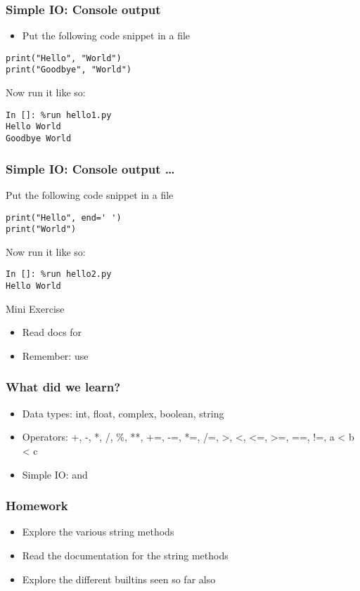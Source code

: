 \documentclass[14pt,compress]{beamer}
\begin{document}
\begin{frame}[fragile]
  \frametitle{Simple IO: Console output}
  \begin{itemize}
  \item Put the following code snippet in a file 
  \end{itemize}
  \begin{lstlisting}
print("Hello", "World")
print("Goodbye", "World")
\end{lstlisting}
Now run it like so:
\begin{lstlisting}
In []: %run hello1.py
Hello World
Goodbye World
  \end{lstlisting}
\end{frame}

\begin{frame}[fragile]
  \frametitle{Simple IO: Console output \ldots}
Put the following code snippet in a file 
  \begin{lstlisting}
print("Hello", end=' ')
print("World")
\end{lstlisting}
Now run it like so:
\begin{lstlisting}
In []: %run hello2.py
Hello World
  \end{lstlisting}

\pause

\begin{block}{Mini Exercise}
  \begin{itemize}
  \item Read docs for 
  \item Remember: use  \
  \end{itemize}
\end{block}
\end{frame}

\begin{frame}[fragile]
  \frametitle{What did we learn?}
  \begin{itemize}
    \item Data types: int, float, complex, boolean, string
    \item Operators: +, -, *, /, \%, **, +=, -=, *=, /=, >, <, <=, >=, ==, !=, a < b < c
    \item Simple IO: \kwrd{input} and \kwrd{print}
  \end{itemize}
\end{frame}

\begin{frame}
  \frametitle{Homework}
  \begin{itemize}
  \item Explore the various string methods
  \item Read the documentation for the string methods
  \item Explore the different builtins seen so far also
  \end{itemize}
\end{frame}
\end{document}
